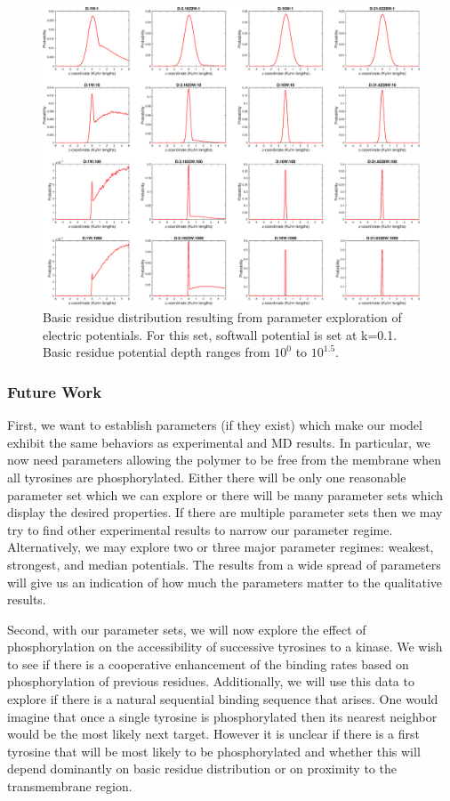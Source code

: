 \documentclass[../../AdvancementSummary.tex]{subfiles}
\begin{document}
\begin{figure}[H]
	\begin{center}
		\includegraphics[width=0.8\linewidth]{ResultsFigures/Electro/DistributioniSite7.eps}
	\end{center}
	\caption{Basic residue distribution resulting from parameter exploration of electric potentials. For this set, softwall potential is set at k=0.1. Basic residue potential depth ranges from $10^0$ to $10^{1.5}$.}
\end{figure}




\subsubsection{Future Work}

First, we want to establish parameters (if they exist) which make our model exhibit the same behaviors as experimental and MD results. In particular, we now need parameters allowing the polymer to be free from the membrane when all tyrosines are phosphorylated. Either there will be only one reasonable parameter set which we can explore or there will be many parameter sets which display the desired properties.  If there are multiple parameter sets then we may try to find other experimental results to narrow our parameter regime. Alternatively, we may explore two or three major parameter regimes: weakest, strongest, and median potentials. The results from a wide spread of parameters will give us an indication of how much the parameters matter to the qualitative results.  

Second, with our parameter sets, we will now explore the effect of phosphorylation on the accessibility of successive tyrosines to a kinase.  We wish to see if there is a cooperative enhancement of the binding rates based on phosphorylation of previous residues.  Additionally, we will use this data to explore if there is a natural sequential binding sequence that arises.  One would imagine that once a single tyrosine is phosphorylated then its nearest neighbor would be the most likely next target.  However it is unclear if there is a first tyrosine that will be most likely to be phosphorylated and whether this will depend dominantly on basic residue distribution or on proximity to the transmembrane region.
\end{document}
